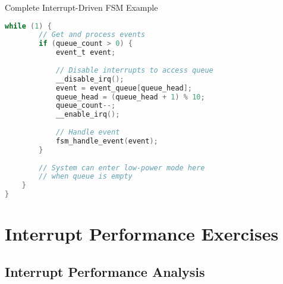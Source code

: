 \begin{example2}{Complete Interrupt-Driven FSM Example}
\begin{lstlisting}[language=C, style=basesmol]
    while (1) {
        // Get and process events
        if (queue_count > 0) {
            event_t event;
            
            // Disable interrupts to access queue
            __disable_irq();
            event = event_queue[queue_head];
            queue_head = (queue_head + 1) % 10;
            queue_count--;
            __enable_irq();
            
            // Handle event
            fsm_handle_event(event);
        }
        
        // System can enter low-power mode here
        // when queue is empty
    }
}
\end{lstlisting}
\end{example2}

\section{Interrupt Performance Exercises}

\subsection{Interrupt Performance Analysis}

